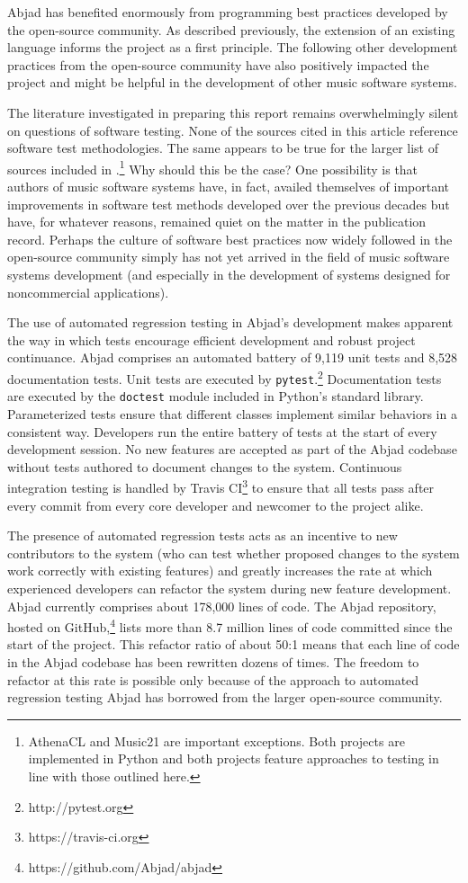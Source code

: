 \documentclass{article}
\begin{document}
Abjad has benefited enormously from programming best practices developed by the
open-source community. As described previously, the extension of an existing
language informs the project as a first principle. The following other
development practices from the open-source community have also positively
impacted the project and might be helpful in the development of other music
software systems.

The literature investigated in preparing this report remains overwhelmingly
silent on questions of software testing. None of the sources cited in this
article reference software test methodologies. The same appears to be true for
the larger list of sources included in
\cite{trevino2013compositional}.\footnote{AthenaCL \cite{Ariza2005} and Music21 \cite{Ariza2010} are important exceptions. Both projects are implemented in
Python and both projects feature approaches to testing in line with those
outlined here.} Why should this be the case? One possibility is that authors
of music software systems have, in fact, availed themselves of important
improvements in software test methods developed over the previous decades but
have, for whatever reasons, remained quiet on the matter in the publication
record. Perhaps the culture of software best practices now widely followed in
the open-source community simply has not yet arrived in the field of music
software systems development (and especially in the development of systems
designed for noncommercial applications).

The use of automated regression testing in Abjad's development makes apparent
the way in which tests encourage efficient development and robust project
continuance. Abjad comprises an automated battery of 9,119 unit tests
and 8,528 documentation tests. Unit tests are executed by \texttt{pytest}.\footnote{http://pytest.org}
Documentation tests are executed by the \texttt{doctest} module included in
Python's standard library. Parameterized tests ensure that different classes
implement similar behaviors in a consistent way. Developers run the entire
battery of tests at the start of every development session. No new features are
accepted as part of the Abjad codebase without tests authored to document
changes to the system. Continuous integration testing is handled by Travis CI\footnote{https://travis-ci.org}
to ensure that all tests pass after every commit from every core developer and
newcomer to the project alike.

The presence of automated regression tests acts as an incentive to new
contributors to the system (who can test whether proposed changes to the system
work correctly with existing features) and greatly increases the rate at which
experienced developers can refactor the system during new feature development.
Abjad currently comprises about 178,000 lines of code. The Abjad
repository, hosted on GitHub,\footnote{https://github.com/Abjad/abjad} lists
more than 8.7 million lines of code committed since the start of the project.
This refactor ratio of about 50:1 means that each line of code in the Abjad
codebase has been rewritten dozens of times. The freedom to refactor at this rate is
possible only because of the approach to automated regression testing Abjad has
borrowed from the larger open-source community.
\end{document}
